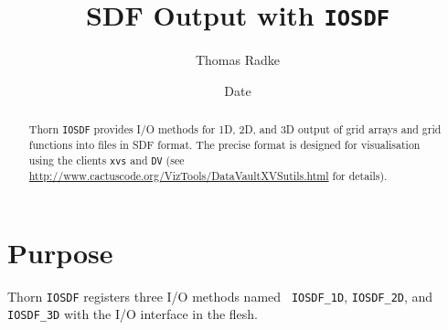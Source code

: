 \documentclass{article}
\begin{document}
\title{SDF Output with {\tt IOSDF}}
\author{Thomas Radke}
\date{$ $Date$ $}

\maketitle


\begin{abstract}
Thorn {\tt IOSDF} provides I/O methods for 1D, 2D, and 3D output of
grid arrays and grid functions into files in SDF format. The precise
format is designed for visualisation using the clients {\tt xvs} and
{\tt DV} (see \url{http://www.cactuscode.org/VizTools/DataVaultXVSutils.html} for details).
\end{abstract}

\section{Purpose}
Thorn {\tt IOSDF} registers three I/O methods named {\tt
IOSDF\_1D}, {\tt IOSDF\_2D}, and {\tt IOSDF\_3D} with the I/O
interface in the flesh.
\end{document}
